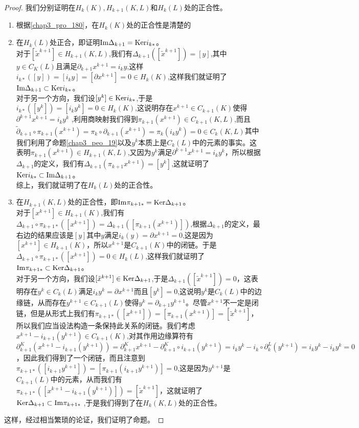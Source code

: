  \begin{proof}
 我们分别证明在$H_{k}(K),H_{k+1}(K,L)$和$H_{k}(L)$处的正合性。
\begin{enumerate}
    \item 根据\eqref{chap3_pro_180}，在$H_{k}(K)$处的正合性是清楚的
    \item 在$H_{k}(L)$处正合，即证明${\rm Im} \Delta_{k+1}={\rm Ker} i_{k*}$。\\
    对于$[\tilde{x}^{k+1}]\in H_{k+1}(K,L)$,我们有$\Delta_{k+1}([\tilde{x}^{k+1}])=[y]$,其中$y\in C_{K}(L)$且满足$\partial_{k+1}x^{k+1}=i_{k}y$,这样$i_{k*}([y])=[i_{k}y]=[\partial x^{k+1}]=0\in H_{k}(K)$,这样我们就证明了${\rm Im} \Delta_{k+1}\subset {\rm Ker} i_{k*}$。\\
    对于另一个方向，我们设$[y^{k}]\in{\rm Ker} i_{k*}$,于是$i_{k*}([y^{k}])=[i_{k}y^{k}]=0\in H_{k}(K)$,这说明存在$x^{k+1}\in C_{k+1}(K)$使得$\partial^{k+1}x^{k+1}=i_{k}y^{k}$
    ,利用商映射我们得到$\pi_{k+1}(x^{k+1})\in C_{k+1}(K,L)$,而且$\tilde{\partial}_{k+1}\circ\pi_{k+1}(x^{k+1})=\pi_{k}\circ\partial_{k+1}(x^{k+1})=\pi_{k}(i_{k}y^{k})=0\in C_{k}(K,L)$其中我们利用了命题\eqref{chap3_peo_19}以及$y^{k}$本质上是$C_{k}(L)$中的元素的事实。这表明$\pi_{k+1}(x^{k+1})\in H_{k+1}(K,L)$,又因为$y^{k}$满足$\partial^{k+1}x^{k+1}=i_{k}y^{k}$，所以根据$\Delta_{k+1}$的定义，我们有$\Delta_{k+1}(\pi_{k+1}x^{k+1})=[y^{k}]$,这就证明了${\rm Ker} i_{k*}\subset {\rm Im} \Delta_{k+1}$。\\
    综上，我们就证明了在$H_{k}(L)$处的正合性。
    \item 在$H_{k+1}(K,L)$处的正合性，即${\rm Im} \pi_{k+1*}={\rm Ker}\Delta_{k+1}$。\\
    对于$[x^{k+1}]\in H_{k+1}(K)$,我们有$\Delta_{k+1}\circ\pi_{k+1*}([x^{k+1}])=\Delta_{k+1}([\pi_{k+1}(x^{k+1})])$,根据$\Delta_{k+1}$的定义，最右边的结果应该是$[y]$其中$y$满足$i_{k}(y)=\partial x^{k+1}=0$,这是因为$[x^{k+1}]\in H_{k+1}(K)$，所以$x^{k+1}$是$C_{k+1}(K)$中的闭链。于是$\Delta_{k+1}\circ \pi_{k+1*}([x^{k+1}])=0\in H_{k}(L)$,这样我们就证明了${\rm Im} \pi_{k+1*}\subset{\rm Ker} \Delta_{k+1}$。\\
    对于另一个方向，我们设$[\tilde{x}^{k+1}]\in{\rm Ker} \Delta_{k+1}$,于是$\Delta_{k+1}([\tilde{x}^{k+1}])=0$，这表明存在$y^{k}\in C_{k}(L)$满足$i_{k}y^{k}=\partial x^{k+1}$而且$[y^{k}]=0$,这说明$y^{k}$是$C_{k}(L)$中的边缘链，从而存在$y^{k+1}\in C_{k+1}(L)$使得$y^{k}=\partial_{k+1}y^{k+1}$。尽管$x^{k+1}$不一定是闭链，但是从形式上我们有$\pi_{k+1*}([x^{k+1}])=[\pi_{k+1}(x^{k+1})]=[\tilde{x}^{k+1}]$，所以我们应当设法构造一条保持此关系的闭链。我们考虑$x^{k+1}-i_{k+1}(y^{k+1})\in C_{k+1}(K)$,对其作用边缘算符有$\partial_{k+1}^{K}(x^{k+1}-i_{k+1}(y^{k+1}))=\partial_{k+1}^{K}x^{k+1}-\partial_{k+1}^{K}\circ i_{k+1}(y^{k+1})=i_{k}y^{k}-i_{k}\circ\partial^{L}_{k}(y^{k+1})=i_{k}y^{k}-i_{k}y^{k}=0$，因此我们得到了一个闭链，而且注意到$\pi_{k+1*}([i_{k+1}y^{k+1}])=[\pi_{k+1}(i_{k+1}y^{k+1})]=0$,这是因为$y^{k+1}$是$C_{k+1}(L)$中的元素，从而我们有$\pi_{k+1*}([x^{k+1}-i_{k+1}(y^{k+1})])=[\tilde{x}^{k+1}]$，这就证明了${\rm Ker} \Delta_{k+1}\subset{\rm Im} \pi_{k+1*}$
    ,于是我们得到了在$H_{k}(K,L)$处的正合性。
\end{enumerate}
这样，经过相当繁琐的论证，我们证明了命题。
 \end{proof}
